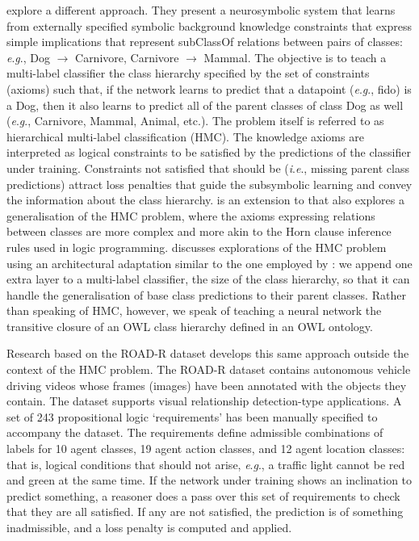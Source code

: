 \documentclass[]{jair}
\newcommand{\ie}{\textit{i}.\textit{e}.,\xspace}
\newcommand{\eg}{\textit{e}.\textit{g}.,\xspace}
\begin{document}
\citet{DBLP:conf/nips/GiunchigliaL20} explore a different approach.
They present a neurosymbolic system that learns from externally specified symbolic background knowledge constraints that express simple implications that represent subClassOf relations between pairs of classes: \eg Dog $\rightarrow$ Carnivore, Carnivore $\rightarrow$ Mammal.
The objective is to teach a multi-label classifier the class hierarchy specified by the set of constraints (axioms) such that, if the network learns to predict that a datapoint (\eg fido) is a Dog, then it also learns to predict all of the parent classes of class Dog as well (\eg Carnivore, Mammal, Animal, etc.).
The problem itself is referred to as hierarchical multi-label classification (HMC).
The knowledge axioms are interpreted as logical constraints to be satisfied by the predictions of the classifier under training.
Constraints not satisfied that should be (\ie missing parent class predictions) attract loss penalties that guide the subsymbolic learning and convey the information about the class hierarchy.
\citet{DBLP:journals/jair/GiunchigliaL21} is an extension to \citet{DBLP:conf/nips/GiunchigliaL20} that also explores a generalisation of the HMC problem, where the axioms expressing relations between classes are more complex and more akin to the Horn clause inference rules used in logic programming.
\citet{HerronThesis2025} discusses explorations of the HMC problem using an architectural adaptation similar to the one employed by \citet{DBLP:conf/nips/GiunchigliaL20,DBLP:journals/jair/GiunchigliaL21}: we append one extra layer to a multi-label classifier, the size of the class hierarchy, so that it can handle the generalisation of base class predictions to their parent classes.
Rather than speaking of HMC, however, we speak of teaching a neural network the transitive closure of an OWL class hierarchy defined in an OWL ontology. 

Research based on the ROAD-R dataset \cite{Giunchiglia2023} develops this same approach outside the context of the HMC problem.
The ROAD-R dataset contains autonomous vehicle driving videos whose frames (images) have been annotated with the objects they contain.
The dataset supports visual relationship detection-type applications.
A set of 243 propositional logic `requirements' has been manually specified to accompany the dataset.
The requirements define admissible combinations of labels for 10 agent classes, 19 agent action classes, and 12 agent location classes: that is, logical conditions that should not arise, \eg a traffic light cannot be red and green at the same time.
If the network under training shows an inclination to predict something, a reasoner does a pass over this set of requirements to check that they are all satisfied.
If any are not satisfied, the prediction is of something inadmissible, and a loss penalty is computed and applied.
\end{document}
